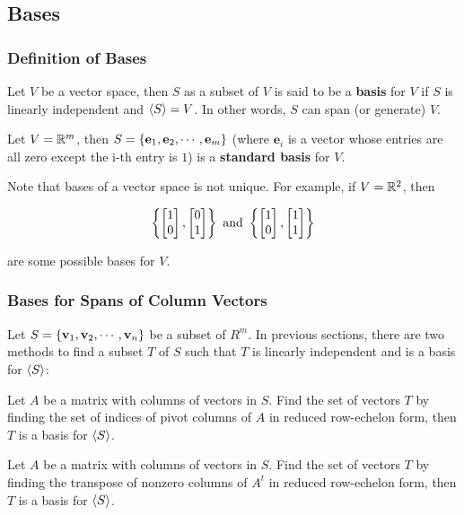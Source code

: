 \documentclass[a4paper,12pt]{article}
\begin{document}
\subsection{Bases}
\subsubsection{Definition of Bases}
\begin{dft}
  Let $V$ be a vector space, then $S$ as a subset of $V$ is said to be a \textbf{basis} for $V$ if $S$ is linearly independent and $\left\langle S\right\rangle=V$. In other words, $S$ can span (or generate) $V$.
\end{dft}\n

\begin{dft}
  Let $V=\mathbb{R}^{m}$, then $S=\left\{ \mathbf{e}_{1},\mathbf{e}_{2},\cdots,\mathbf{e}_{m}\right\}$ (where $\mathbf{e}_{i}$ is a vector whose entries are all zero except the i-th entry is $1$) is a \textbf{standard basis} for $V$.
\end{dft}\n

Note that bases of a vector space is not unique. For example, if $V=\mathbb{R}^{2}$, then
\pagebreak

$$\left\{ \begin{bmatrix}
  1\\
  0
\end{bmatrix},\begin{bmatrix}
  0\\
  1
\end{bmatrix}\right\}\text{ and }\left\{ \begin{bmatrix}
  1\\
  0
\end{bmatrix},\begin{bmatrix}
  1\\
  1
\end{bmatrix}\right\}$$\s

are some possible bases for $V$.\n

\subsubsection{Bases for Spans of Column Vectors}
Let $S=\left\{ \mathbf{v}_{1},\mathbf{v}_{2},\cdots,\mathbf{v}_{n}\right\}$ be a subset of $R^{m}$. In previous sections, there are two methods to find a subset $T$ of $S$ such that $T$ is linearly independent and is a basis for $\left\langle S\right\rangle$:

\begin{alist}
  \item Let $A$ be a matrix with columns of vectors in $S$. Find the set of vectors $T$ by finding the set of indices of pivot columns of $A$ in reduced row-echelon form, then $T$ is a basis for $\left\langle S\right\rangle$.
  \item Let $A$ be a matrix with columns of vectors in $S$. Find the set of vectors $T$ by finding the transpose of nonzero columns of $A^{t}$ in reduced row-echelon form, then $T$ is a basis for $\left\langle S\right\rangle$.
\end{alist}
\end{document}

